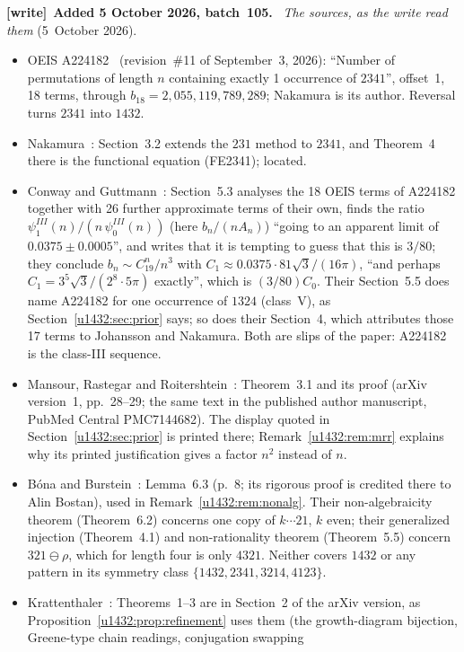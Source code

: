 \documentclass[11pt]{article}
\theoremstyle{remark}\newtheorem{remark}[theorem]{Remark}
\newenvironment{writenote}[1][]{\par\smallskip\begingroup\small
 \noindent\textbf{[write]}\if\relax\detokenize{#1}\relax\else~\textbf{#1.}\fi\ }%
 {\par\endgroup\smallskip}
\begin{document}
\begin{writenote}[Added 5 October 2026, batch~105]
\emph{The sources, as the write read them} (5~October 2026).
\begin{itemize}
\item OEIS A224182~\cite{OEIS} (revision~\#11 of September~3, 2026): ``Number
 of permutations of length $n$ containing exactly 1 occurrence of $2341$'',
 offset~1, 18 terms, through $b_{18}=2{,}055{,}119{,}789{,}289$; Nakamura
 is its author. Reversal turns $2341$ into $1432$.
\item Nakamura~\cite{Nakamura}: Section~3.2 extends the $231$ method to
 $2341$, and Theorem~4 there is the functional equation (FE2341); located.
\item Conway and Guttmann~\cite{CG}: Section~5.3 analyses the 18 OEIS terms
 of A224182 together with 26 further approximate terms of their own, finds
 the ratio $\psi^{III}_1(n)/(n\,\psi^{III}_0(n))$ (here $b_n/(nA_n)$)
 ``going to an apparent limit of $0.0375\pm0.0005$'', and writes that it is
 tempting to guess that this is $3/80$; they conclude
 $b_n\sim C_19^n/n^3$ with $C_1\approx0.0375\cdot81\sqrt3/(16\pi)$, ``and
 perhaps $C_1=3^5\sqrt3/(2^8\cdot5\pi)$ exactly'', which is $(3/80)C_0$.
 Their Section~5.5 does name A224182 for one occurrence of $1324$ (class~V),
 as Section~\ref{u1432:sec:prior} says; so does their Section~4, which
 attributes those 17 terms to Johansson and Nakamura. Both are slips of the
 paper: A224182 is the class-III sequence.
\item Mansour, Rastegar and Roitershtein~\cite{MRR}: Theorem~3.1 and its
 proof (arXiv version~1, pp.~28--29; the same text in the published author
 manuscript, PubMed Central PMC7144682). The display quoted in
 Section~\ref{u1432:sec:prior} is printed there; Remark~\ref{u1432:rem:mrr}
 explains why its printed justification gives a factor $n^2$ instead of $n$.
\item B\'ona and Burstein~\cite{BB}: Lemma~6.3 (p.~8; its rigorous proof is
 credited there to Alin Bostan), used in Remark~\ref{u1432:rem:nonalg}. Their
 non-algebraicity theorem (Theorem~6.2) concerns one copy of $k\cdots21$, $k$
 even; their generalized injection (Theorem~4.1) and non-rationality theorem
 (Theorem~5.5) concern $321\ominus\rho$, which for length four is only
 $4321$. Neither covers $1432$ or any pattern in its symmetry class
 $\{1432,2341,3214,4123\}$.
\item Krattenthaler~\cite{Kratt}: Theorems~1--3 are in Section~2 of the arXiv
 version, as Proposition~\ref{u1432:prop:refinement} uses them (the
 growth-diagram bijection, Greene-type chain readings, conjugation swapping

\end{itemize}
\end{writenote}
\end{document}
